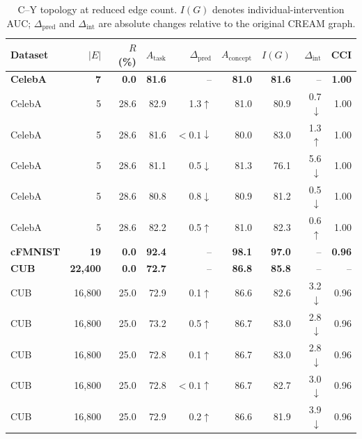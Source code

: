 \begin{table}[t]
\centering
\caption{C--Y topology at reduced edge count. $I(G)$ denotes individual-intervention AUC; $\Delta_{\mathrm{pred}}$ and $\Delta_{\mathrm{int}}$ are absolute changes relative to the original CREAM graph.}
\label{tab:cy_reduced_topology}
\small
\setlength{\tabcolsep}{6pt}
\begin{tabular}{lrrrrrrrr}
\toprule
Dataset & $|E|$ & $R$ (\%) & $A_{\mathrm{task}}$ & $\Delta_{\mathrm{pred}}$ & $A_{\mathrm{concept}}$ & $I(G)$ & $\Delta_{\mathrm{int}}$ & CCI \\
\midrule
\rowcolor{gray!15}
\textbf{CelebA} & \textbf{7} & \textbf{0.0} & \textbf{81.6} & -- & \textbf{81.0} & \textbf{81.6} & -- & \textbf{1.00} \\
CelebA & 5 & 28.6 & 82.9 & 1.3$\uparrow$ & 81.0 & 80.9 & 0.7$\downarrow$ & 1.00 \\
CelebA & 5 & 28.6 & 81.6 & $<0.1\downarrow$ & 80.0 & 83.0 & 1.3$\uparrow$ & 1.00 \\
CelebA & 5 & 28.6 & 81.1 & 0.5$\downarrow$ & 81.3 & 76.1 & 5.6$\downarrow$ & 1.00 \\
CelebA & 5 & 28.6 & 80.8 & 0.8$\downarrow$ & 80.9 & 81.2 & 0.5$\downarrow$ & 1.00 \\
CelebA & 5 & 28.6 & 82.2 & 0.5$\uparrow$ & 81.0 & 82.3 & 0.6$\uparrow$ & 1.00 \\
\midrule
\rowcolor{gray!15}
\textbf{cFMNIST} & \textbf{19} & \textbf{0.0} & \textbf{92.4} & -- & \textbf{98.1} & \textbf{97.0} & -- & \textbf{0.96} \\
\midrule
\rowcolor{gray!15}
\textbf{CUB} & \textbf{22,400} & \textbf{0.0} & \textbf{72.7} & -- & \textbf{86.8} & \textbf{85.8} & -- & -- \\
CUB & 16,800 & 25.0 & 72.9 & 0.1$\uparrow$ & 86.6 & 82.6 & 3.2$\downarrow$ & 0.96 \\
CUB & 16,800 & 25.0 & 73.2 & 0.5$\uparrow$ & 86.7 & 83.0 & 2.8$\downarrow$ & 0.96 \\
CUB & 16,800 & 25.0 & 72.8 & 0.1$\uparrow$ & 86.7 & 83.0 & 2.8$\downarrow$ & 0.96 \\
CUB & 16,800 & 25.0 & 72.8 & $<0.1\uparrow$ & 86.7 & 82.7 & 3.0$\downarrow$ & 0.96 \\
CUB & 16,800 & 25.0 & 72.9 & 0.2$\uparrow$ & 86.6 & 81.9 & 3.9$\downarrow$ & 0.96 \\
\bottomrule
\end{tabular}
\end{table}
